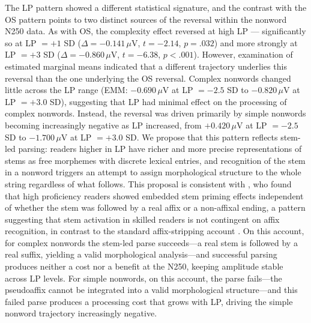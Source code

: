 \documentclass[utf8]{FrontiersinHarvard} %
\begin{document}
	The LP pattern showed a different statistical signature, and the contrast with the OS pattern points to two distinct sources of the reversal within the nonword N250 data. As with OS, the complexity effect reversed at high LP --- significantly so at LP $= +1$ SD ($\Delta = -0.141\,\mu$V, $t = -2.14$, $p = .032$) and more strongly at LP $= +3$ SD ($\Delta = -0.860\,\mu$V, $t = -6.38$, $p < .001$). However, examination of estimated marginal means indicated that a different trajectory underlies this reversal than the one underlying the OS reversal. Complex nonwords changed little across the LP range (EMM: $-0.690\,\mu$V at LP $= -2.5$ SD to $-0.820\,\mu$V at LP $= +3.0$ SD), suggesting that LP had minimal effect on the processing of complex nonwords. Instead, the reversal was driven primarily by simple nonwords becoming increasingly negative as LP increased, from $+0.420\,\mu$V at LP $= -2.5$ SD to $-1.700\,\mu$V at LP $= +3.0$ SD. We propose that this pattern reflects stem-led parsing: readers higher in LP have richer and more precise representations of stems as free morphemes with discrete lexical entries, and recognition of the stem in a nonword triggers an attempt to assign morphological structure to the whole string regardless of what follows. This proposal is consistent with \citet{beyersmannEmbeddedStemPriming2016}, who found that high proficiency readers showed embedded stem priming effects independent of whether the stem was followed by a real affix or a non-affixal ending, a pattern suggesting that stem activation in skilled readers is not contingent on affix recognition, in contrast to the standard affix-stripping account \citep{taft_lexical_1975, rastleMorphologicalDecompositionBased2008}. On this account, for complex nonwords the stem-led parse succeeds---a real stem is followed by a real suffix, yielding a valid morphological analysis---and successful parsing produces neither a cost nor a benefit at the N250, keeping amplitude stable across LP levels. For simple nonwords, on this account, the parse fails---the pseudoaffix cannot be integrated into a valid morphological structure---and this failed parse produces a processing cost that grows with LP, driving the simple nonword trajectory increasingly negative.
	
\end{document}
